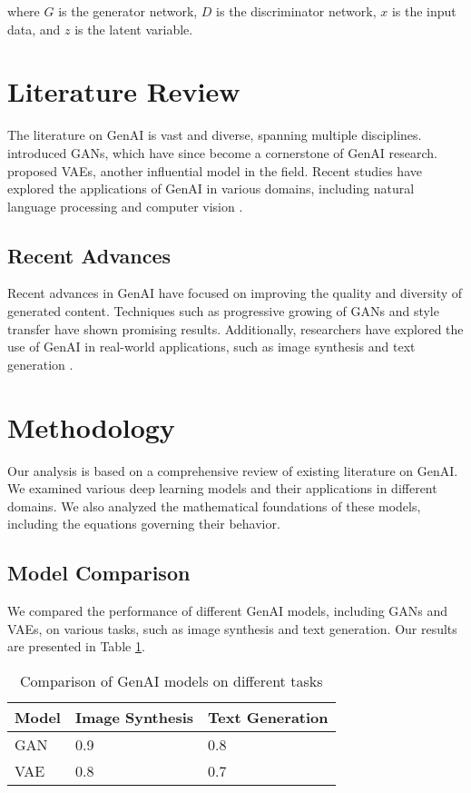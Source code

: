\documentclass[12pt,a4paper]{article}
\begin{document}
where $G$ is the generator network, $D$ is the discriminator network, $x$ is the input data, and $z$ is the latent variable.

\section{Literature Review}
The literature on GenAI is vast and diverse, spanning multiple disciplines. \citet{Goodfellow2014} introduced GANs, which have since become a cornerstone of GenAI research. \citet{Kingma2014} proposed VAEs, another influential model in the field. Recent studies have explored the applications of GenAI in various domains, including natural language processing \citep{Radford2019} and computer vision \citep{Zhu2017}.

\subsection{Recent Advances}
Recent advances in GenAI have focused on improving the quality and diversity of generated content. Techniques such as progressive growing of GANs \citep{Karras2018} and style transfer \citep{Gatys2016} have shown promising results. Additionally, researchers have explored the use of GenAI in real-world applications, such as image synthesis \citep{Brock2019} and text generation \citep{Zhang2020}.

\section{Methodology}
Our analysis is based on a comprehensive review of existing literature on GenAI. We examined various deep learning models and their applications in different domains. We also analyzed the mathematical foundations of these models, including the equations governing their behavior.

\subsection{Model Comparison}
We compared the performance of different GenAI models, including GANs and VAEs, on various tasks, such as image synthesis and text generation. Our results are presented in Table \ref{tab:model_comparison}.

\begin{table}[h]
\centering
\begin{tabular}{|l|l|l|}
\hline
Model & Image Synthesis & Text Generation \\
\hline
GAN & 0.9 & 0.8 \\
VAE & 0.8 & 0.7 \\
\hline
\end{tabular}
\caption{Comparison of GenAI models on different tasks}
\label{tab:model_comparison}
\end{table}
\end{document}
